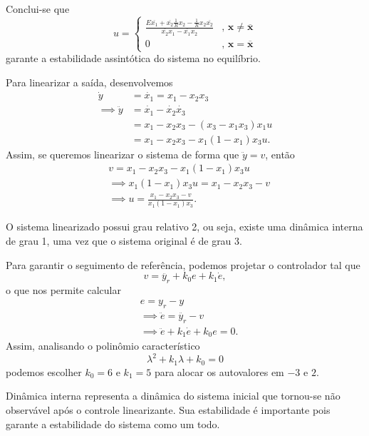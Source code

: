 \documentclass[a4paper]{report}
\begin{document}
Conclui-se que \[
u = \begin{cases}
    \frac{E \overline{x_1} +\overline{x_2}\frac{1}{R}x_2 -\frac{1}{R}x_2\overline{x_2} }{\overline{x_2}x_1 -\overline{x_1}x_2} &\text{, }\bm{x} \neq \bm{\overline{x}} \\
    0 &\text{, }\bm{x} = \bm{\overline{x}}
\end{cases}
\] garante a estabilidade assintótica do sistema no equilíbrio.



Para linearizar a saída, desenvolvemos
\begin{align*}
    \dot{y} &= \dot{x_1} = x_1 - x_2x_3 \\
    \implies \ddot{y} &= \dot{x_1} -\dot{x_2}\dot{x_3} \\
		      &= x_1 -x_2x_3 -\left( x_3 -x_1x_3 \right) x_1u  \\
		      &= x_1 - x_2x_3 -x_1\left( 1-x_1 \right) x_3 u
.\end{align*}
Assim, se queremos linearizar o sistema de forma que $\ddot{y} = v$, então
\begin{align*}
    &v = x_1 - x_2x_3 -x_1\left( 1-x_1 \right) x_3 u \\
    & \implies x_1\left( 1-x_1 \right) x_3 u = x_1 - x_2x_3 - v \\
    & \implies u = \frac{x_1 - x_2x_3 - v}{x_1\left( 1-x_1 \right) x_3}
.\end{align*}


O sistema linearizado possui grau relativo 2, ou seja, existe uma dinâmica interna de grau 1, uma vez que o sistema original é de grau 3.


Para garantir o seguimento de referência, podemos projetar o controlador tal que \[
v = \ddot{y_r} + k_0e + k_1 \dot{e}
,\] o que nos permite calcular
\begin{align*}
    &e = y_r - y \\
    &\implies \ddot{e} = \ddot{y_r} - v \\
    &\implies \ddot{e} + k_1 \dot{e} + k_0 e = 0
.\end{align*}
Assim, analisando o polinômio característico \[
    \lambda^2 + k_1\lambda + k_0 = 0
\] podemos escolher $k_0 = 6$ e $k_1 = 5$ para alocar os autovalores em $-3$ e $2$.


Dinâmica interna representa a dinâmica do sistema inicial que tornou-se não observável após o controle linearizante. Sua estabilidade é importante pois garante a estabilidade do sistema como um todo.
\end{document}
